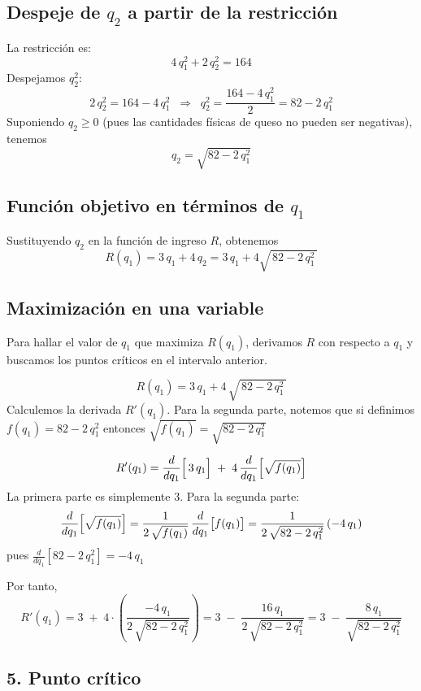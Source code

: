 \documentclass{article}
\begin{document}
\subsection*{Despeje de \(q_2\) a partir de la restricción}

La restricción es:
\[
4\,q_1^2 + 2\,q_2^2 = 164
\]
Despejamos \(q_2^2\):
\[
2\,q_2^2 = 164 - 4\,q_1^2
\;\;\Longrightarrow\;\;
q_2^2 = \frac{164 - 4\,q_1^2}{2} = 82 - 2\,q_1^2
\]
Suponiendo \(q_2 \ge 0\) (pues las cantidades físicas de queso no pueden ser negativas), tenemos
\[
q_2 = \sqrt{82 - 2\,q_1^2}
\]

\subsection*{Función objetivo en términos de \(q_1\)}

Sustituyendo \(q_2\) en la función de ingreso \(R\), obtenemos
\[
R(q_1) 
= 3\,q_1 + 4\,q_2 
= 3\,q_1 + 4 \sqrt{\,82 - 2\,q_1^2\,}
\]


\subsection*{Maximización en una variable}

Para hallar el valor de \(q_1\) que maximiza \(R(q_1)\), derivamos \(R\) con respecto a \(q_1\) y buscamos los puntos críticos en el intervalo anterior.

\[
R(q_1) = 3\,q_1 + 4\,\sqrt{\,82 - 2\,q_1^2\,}
\]
Calculemos la derivada \(R'(q_1)\). Para la segunda parte, notemos que si definimos 
\(\displaystyle f(q_1) = 82 - 2\,q_1^2\)
entonces 
\(\displaystyle \sqrt{f(q_1)} = \sqrt{82 - 2\,q_1^2}\)

\[
R'(q_1) 
= \frac{d}{dq_1}\Bigl[\,3\,q_1\Bigr] 
  \;+\; 4 \,\frac{d}{dq_1}\Bigl[\sqrt{f(q_1)}\Bigr]
\]
La primera parte es simplemente \(3\). Para la segunda parte:
\[
\frac{d}{dq_1}\Bigl[\sqrt{f(q_1)}\Bigr]
= \frac{1}{2\,\sqrt{f(q_1)}} \,\frac{d}{dq_1}\bigl[f(q_1)\bigr]
= \frac{1}{2\,\sqrt{82 - 2\,q_1^2}} \,(-4\,q_1)
\]
pues \(\frac{d}{dq_1}[82 - 2\,q_1^2] = -4\,q_1\)

Por tanto,
\[
R'(q_1) 
= 3 
  \;+\; 4 \cdot \left(\frac{-4\,q_1}{2\,\sqrt{82 - 2\,q_1^2}}\right)
= 3 \;-\; \frac{16\,q_1}{2\,\sqrt{82 - 2\,q_1^2}}
= 3 \;-\; \frac{8\,q_1}{\sqrt{82 - 2\,q_1^2}}
\]

\subsection*{5. Punto crítico}
\end{document}
